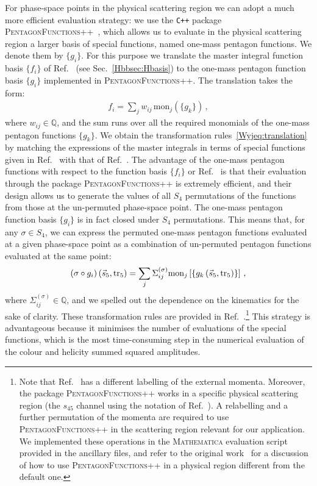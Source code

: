 \documentclass[main.tex]{subfiles}
\begin{document}
For phase-space points in the physical scattering region we can adopt a much more efficient evaluation strategy: we use the \texttt{C++} package \textsc{PentagonFunctions++}~\cite{Chicherin:2021dyp}, which allows us to evaluate in the physical scattering region a larger basis of special functions, named one-mass pentagon functions. We denote them by $\{g_i\}$.
For this purpose we translate the master integral function basis $\{f_i\}$ of Ref.~\cite{Badger:2021nhg} (see Sec.~\ref{Hbbsec:Hbasis}) to the one-mass pentagon function basis $\{g_i\}$ implemented in \textsc{PentagonFunctions++}. The translation takes the form:
\begin{align} \label{Wyjeq:translation}
f_i = \sum_{j} w_{ij} \, \text{mon}_j \left(\{g_k\} \right) \,,
\end{align}
where $w_{ij} \in \mathbb{Q}$, and the sum runs over all the required monomials of the one-mass pentagon functions $\{g_k\}$. We obtain the transformation rules~\eqref{Wyjeq:translation} by matching the expressions of the master integrals in terms of special functions given in Ref.~\cite{Badger:2021nhg} with that of Ref.~\cite{Chicherin:2021dyp}. The advantage of the one-mass pentagon functions with respect to the function basis $\{f_i\}$ or Ref.~\cite{Badger:2021nhg} is that their evaluation through the package \textsc{PentagonFunctions++} is extremely efficient, and their design allows us to generate the values of all $S_4$ permutations of the functions from those at the un-permuted phase-space point. 
The one-mass pentagon function basis $\{g_i\}$ is in fact closed under $S_4$ permutations. This means that, for any $\sigma \in S_4$, we can express the permuted one-mass pentagon functions evaluated at a given phase-space point as a combination of un-permuted pentagon functions evaluated at the same point:
\begin{align} \label{Wyjeq:permf}
\left(\sigma \circ g_i\right)(\vec{s}_5, \operatorname{\rm tr}_5) = \sum_j \Sigma_{ij}^{(\sigma)} \text{mon}_j \left[ \{ g_k\left(\vec{s}_5, \operatorname{\rm tr}_5 \right) \} \right] \,,
\end{align}
where $\Sigma_{ij}^{(\sigma)} \in \mathbb{Q}$, and we spelled out the dependence on the kinematics for the sake of clarity. These transformation rules are provided in Ref.~\cite{Chicherin:2021dyp}.\footnote{Note that Ref.~\cite{Chicherin:2021dyp} has a different labelling of the external momenta. Moreover, the package \textsc{PentagonFunctions++} works in a specific physical scattering region (the $s_{45}$ channel using the notation of Ref.~\cite{Chicherin:2021dyp}). A relabelling and a further permutation of the momenta are required to use \textsc{PentagonFunctions++} in the scattering region relevant for our application. We implemented these operations in the \textsc{Mathematica} evaluation script provided in the ancillary files, and refer to the original work~\cite{Chicherin:2021dyp} for a discussion of how to use \textsc{PentagonFunctions++} in a physical region different from the default one.} This strategy is advantageous because it minimises the number of evaluations of the special functions, which is the most time-consuming step in the  numerical evaluation of the colour and helicity summed squared amplitudes.
\end{document}
